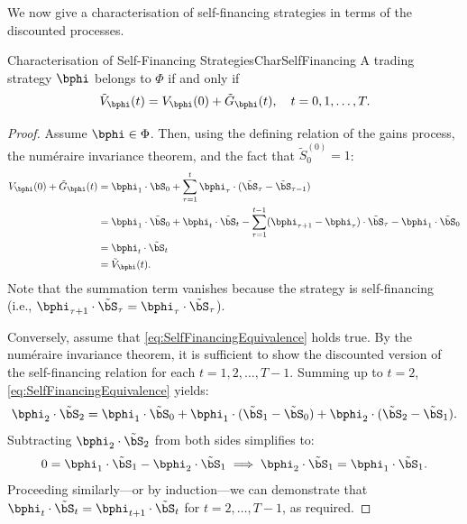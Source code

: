 We now give a characterisation of self-financing strategies in terms of the discounted processes.

\begin{prop}{Characterisation of Self-Financing Strategies}{CharSelfFinancing}
	A trading strategy \(\bphi\) belongs to \(\Phi\) if and only if
	\begin{equation} \label{eq:SelfFinancingEquivalence}
		\tilde{V}_{\bphi}(t) = V_{\bphi}(0) + \tilde{G}_{\bphi}(t), \quad t = 0, 1, \dots, T.
	\end{equation}
\end{prop}

\begin{proof}
	Assume \(\bphi \in \Phi\). Then, using the defining relation of the gains process, the num\'{e}raire invariance theorem, and the fact that \(\tilde{S}_0^{(0)} = 1\):
	\begin{align*}
		V_{\bphi}(0) + \tilde{G}_{\bphi}(t) & = \bphi_1 \cdot \bS_0 + \sum_{\tau=1}^t \bphi_\tau \cdot (\tilde{\bS}_\tau - \tilde{\bS}_{\tau-1})                                                                   \\
		                                    & = \bphi_1 \cdot \tilde{\bS}_0 + \bphi_t \cdot \tilde{\bS}_t - \sum_{\tau=1}^{t-1} (\bphi_{\tau+1} - \bphi_\tau) \cdot \tilde{\bS}_\tau - \bphi_1 \cdot \tilde{\bS}_0 \\
		                                    & = \bphi_t \cdot \tilde{\bS}_t                                                                                                                                        \\
		                                    & = \tilde{V}_{\bphi}(t).
	\end{align*}
	Note that the summation term vanishes because the strategy is self-financing (i.e., \(\bphi_{\tau+1} \cdot \tilde{\bS}_\tau = \bphi_\tau \cdot \tilde{\bS}_\tau\)).

	Conversely, assume that \cref{eq:SelfFinancingEquivalence} holds true. By the num\'{e}raire invariance theorem, it is sufficient to show the discounted version of the self-financing relation for each \(t = 1, 2, \dots, T-1\). Summing up to \(t=2\), \cref{eq:SelfFinancingEquivalence} yields:
	\begin{equation*}
		\bphi_2 \cdot \tilde{\bS}_2 = \bphi_1 \cdot \tilde{\bS}_0 + \bphi_1 \cdot (\tilde{\bS}_1 - \tilde{\bS}_0) + \bphi_2 \cdot (\tilde{\bS}_2 - \tilde{\bS}_1).
	\end{equation*}
	Subtracting \(\bphi_2 \cdot \tilde{\bS}_2\) from both sides simplifies to:
	\begin{equation*}
		0 = \bphi_1 \cdot \tilde{\bS}_1 - \bphi_2 \cdot \tilde{\bS}_1 \implies \bphi_2 \cdot \tilde{\bS}_1 = \bphi_1 \cdot \tilde{\bS}_1.
	\end{equation*}
	Proceeding similarly---or by induction---we can demonstrate that \(\bphi_t \cdot \tilde{\bS}_t = \bphi_{t+1} \cdot \tilde{\bS}_t\) for \(t = 2, \dots, T-1\), as required.
\end{proof}

